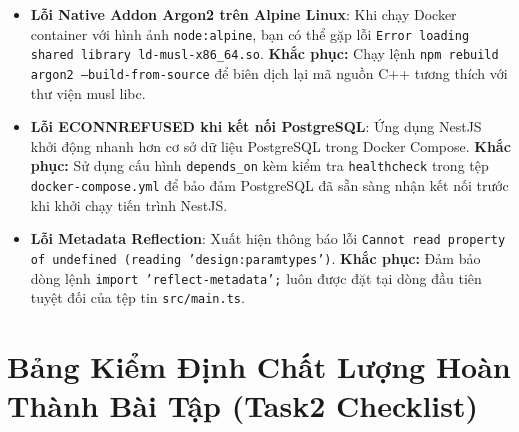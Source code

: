 \documentclass[12pt,a4paper,oneside]{book}
\begin{document}
\begin{itemize}
  \item \textbf{Lỗi Native Addon Argon2 trên Alpine Linux}: Khi chạy Docker container với hình ảnh \texttt{node:alpine}, bạn có thể gặp lỗi \texttt{Error loading shared library ld-musl-x86\_64.so}. \textbf{Khắc phục:} Chạy lệnh \texttt{npm rebuild argon2 --build-from-source} để biên dịch lại mã nguồn C++ tương thích với thư viện musl libc.
  \item \textbf{Lỗi ECONNREFUSED khi kết nối PostgreSQL}: Ứng dụng NestJS khởi động nhanh hơn cơ sở dữ liệu PostgreSQL trong Docker Compose. \textbf{Khắc phục:} Sử dụng cấu hình \texttt{depends\_on} kèm kiểm tra \texttt{healthcheck} trong tệp \texttt{docker-compose.yml} để bảo đảm PostgreSQL đã sẵn sàng nhận kết nối trước khi khởi chạy tiến trình NestJS.
  \item \textbf{Lỗi Metadata Reflection}: Xuất hiện thông báo lỗi \texttt{Cannot read property of undefined (reading 'design:paramtypes')}. \textbf{Khắc phục:} Đảm bảo dòng lệnh \texttt{import 'reflect-metadata';} luôn được đặt tại dòng đầu tiên tuyệt đối của tệp tin \texttt{src/main.ts}.
\end{itemize}

\section{Bảng Kiểm Định Chất Lượng Hoàn Thành Bài Tập (Task2 Checklist)}
\end{document}
